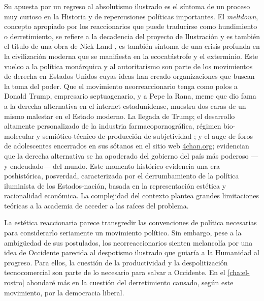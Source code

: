 Su apuesta por un regreso al absolutismo ilustrado es el síntoma de un proceso muy curioso en la Historia y de repercusiones políticas importantes. El \emph{meltdown}, concepto apropiado por los reaccionarios que puede traducirse como hundimiento o derretimiento, se refiere a la decadencia del proyecto de Ilustración y es también el título de una obra de Nick Land \autocite{landFangedNoumenaCollected2018}, es también síntoma de una crisis profunda en la civilización moderna que se manifiesta en la ecocatástrofe y el exterminio. Este vuelco a la política monárquica y al autoritarismo son parte de los movimientos de derecha en Estados Unidos cuyas ideas han creado organizaciones que buscan la toma del poder. Que el movimiento neorreaccionario tenga como polos a Donald Trump, empresario septuagenario, y a Pepe la Rana, meme que dio fama a la derecha alternativa \autocite{huiUnhappyConsciousnessNeoreactionaries2017} en el internet estadunidense, muestra dos caras de un mismo malestar en el Estado moderno. La llegada de Trump; el desarrollo altamente personalizado de la industria farmacopornográfica, régimen bio-molecular y semiótico-técnico de producción de subjetividad \autocite{preciadoTestoYonqui2008}; y el auge de foros de adolescentes encerrados en sus sótanos en el sitio web \url{4chan.org}; evidencian que la derecha alternativa se ha apoderado del gobierno del país más poderoso ---y endeudado--- del mundo. Este momento histórico evidencia una era poshistórica, posverdad, caracterizada por el derrumbamiento de la política iluminista de los Estados-nación, basada en la representación estética y racionalidad económica. La complejidad del contexto plantea grandes limitaciones teóricas a la academia de acceder a las raíces del problema.

La estética reaccionaria parece transgredir las convenciones de  política necesarias para considerarlo seriamente un movimiento político. Sin embargo, pese a la ambigüedad de sus postulados, los neorreaccionarios sienten melancolía por una idea de Occidente parecida al despotismo ilustrado que guiaría a la Humanidad al progreso. Para ellos, la cuestión de la productividad y la despolitización tecnocomercial son parte de lo necesario para salvar a Occidente. En el \ref{cha:el-rostro} ahondaré más en la cuestión del derretimiento causado, según este movimiento, por la democracia liberal.

